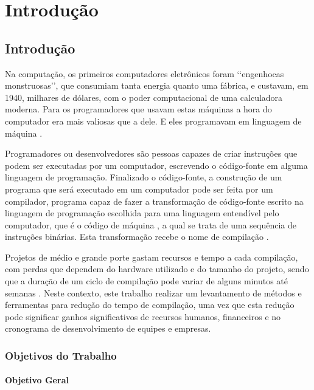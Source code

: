 \part{Introdução}

\chapter*[Introdução]{Introdução}

Na computação, os primeiros computadores eletrônicos foram \lq\lq engenhocas monstruosas\rq\rq,
 que consumiam tanta energia quanto
 uma fábrica, e custavam, em 1940, milhares de dólares, com o poder
 computacional de uma calculadora moderna. Para os
 programadores que usavam estas máquinas a hora do computador era
 mais valiosas que a dele. E eles programavam em linguagem de
 máquina \cite[pág.5]{ref6}.

Programadores ou desenvolvedores são pessoas capazes de criar instruções
 que podem ser executadas por um computador, escrevendo o código-fonte em
 alguma linguagem de programação. Finalizado o código-fonte, a construção
 de um programa que será executado em um computador pode ser feita por um
 compilador, programa capaz de fazer a transformação de
 código-fonte escrito na linguagem de programação escolhida para uma linguagem
 entendível pelo computador, que é o código de máquina \cite[pág.5]{ref6}, a qual
 se trata de uma sequência de instruções binárias.
 Esta transformação recebe o nome de compilação \cite[pág.1]{ref5}.

Projetos de médio e grande porte gastam recursos e tempo a cada compilação,
 com perdas que dependem do hardware utilizado e do tamanho
 do projeto, sendo que a duração de um ciclo de compilação pode variar de
 alguns minutos até semanas \cite[pág.5]{ref6}. Neste contexto, este trabalho
 realizar um levantamento de métodos e ferramentas para redução do
 tempo de compilação, uma vez que esta redução pode significar ganhos
 significativos de recursos humanos, financeiros e no cronograma de
 desenvolvimento de equipes e empresas. 

\section*{Objetivos do Trabalho}

\subsection*{Objetivo Geral}

